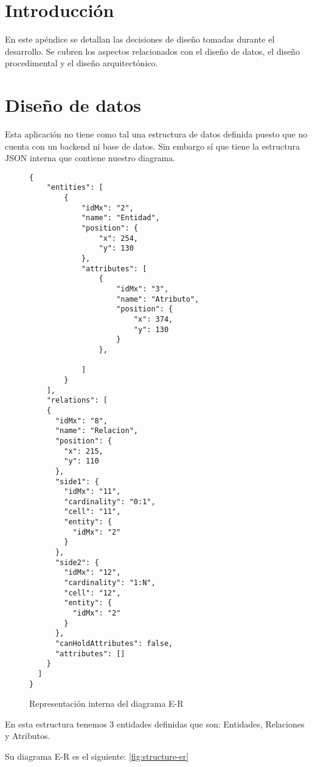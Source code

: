 
\section{Introducción}

En este apéndice se detallan las decisiones de diseño tomadas durante el desarrollo. Se cubren los aspectos relacionados con el diseño de datos, el diseño procedimental y el diseño arquitectónico.

\section{Diseño de datos}
Esta aplicación no tiene como tal una estructura de datos definida puesto que no cuenta con un backend ni base de datos. Sin embargo sí que tiene la estructura JSON interna que contiene nuestro diagrama.

\begin{figure}
\lstset{breaklines=true, basicstyle=\footnotesize}
\begin{lstlisting}[frame=single]
{
    "entities": [
        {
            "idMx": "2",
            "name": "Entidad",
            "position": {
                "x": 254,
                "y": 130
            },
            "attributes": [
                {
                    "idMx": "3",
                    "name": "Atributo",
                    "position": {
                        "x": 374,
                        "y": 130
                    }
                },

            ]
        }
    ],
    "relations": [
    {
      "idMx": "8",
      "name": "Relacion",
      "position": {
        "x": 215,
        "y": 110
      },
      "side1": {
        "idMx": "11",
        "cardinality": "0:1",
        "cell": "11",
        "entity": {
          "idMx": "2"
        }
      },
      "side2": {
        "idMx": "12",
        "cardinality": "1:N",
        "cell": "12",
        "entity": {
          "idMx": "2"
        }
      },
      "canHoldAttributes": false,
      "attributes": []
    }
  ]
}
\end{lstlisting}
\caption{Representación interna del diagrama E-R}
\end{figure}

En esta estructura tenemos 3 entidades definidas que son: Entidades, Relaciones y Atributos.

Su diagrama E-R es el siguiente: \ref{fig:structure-er}

